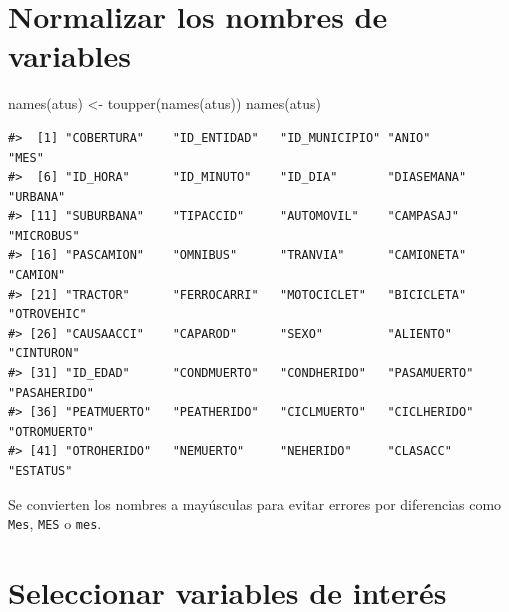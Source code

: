 \documentclass[
  spanish,
  10.5pt,
  letterpaper,
  openany,
  headings=big]{scrbook}
\newenvironment{Shaded}{}{}
\newcommand{\FunctionTok}[1]{\textcolor[rgb]{0.44,0.26,0.76}{#1}}
\newcommand{\NormalTok}[1]{\textcolor[rgb]{0.14,0.16,0.18}{#1}}
\newcommand{\OtherTok}[1]{\textcolor[rgb]{0.44,0.26,0.76}{#1}}
\begin{document}
\section{Normalizar los nombres de
variables}\label{normalizar-los-nombres-de-variables}

\begin{Shaded}
\begin{Highlighting}[]
\FunctionTok{names}\NormalTok{(atus) }\OtherTok{\textless{}{-}} \FunctionTok{toupper}\NormalTok{(}\FunctionTok{names}\NormalTok{(atus))}
\FunctionTok{names}\NormalTok{(atus)}
\end{Highlighting}
\end{Shaded}

\begin{verbatim}
#>  [1] "COBERTURA"    "ID_ENTIDAD"   "ID_MUNICIPIO" "ANIO"         "MES"         
#>  [6] "ID_HORA"      "ID_MINUTO"    "ID_DIA"       "DIASEMANA"    "URBANA"      
#> [11] "SUBURBANA"    "TIPACCID"     "AUTOMOVIL"    "CAMPASAJ"     "MICROBUS"    
#> [16] "PASCAMION"    "OMNIBUS"      "TRANVIA"      "CAMIONETA"    "CAMION"      
#> [21] "TRACTOR"      "FERROCARRI"   "MOTOCICLET"   "BICICLETA"    "OTROVEHIC"   
#> [26] "CAUSAACCI"    "CAPAROD"      "SEXO"         "ALIENTO"      "CINTURON"    
#> [31] "ID_EDAD"      "CONDMUERTO"   "CONDHERIDO"   "PASAMUERTO"   "PASAHERIDO"  
#> [36] "PEATMUERTO"   "PEATHERIDO"   "CICLMUERTO"   "CICLHERIDO"   "OTROMUERTO"  
#> [41] "OTROHERIDO"   "NEMUERTO"     "NEHERIDO"     "CLASACC"      "ESTATUS"
\end{verbatim}

Se convierten los nombres a mayúsculas para evitar errores por
diferencias como \texttt{Mes}, \texttt{MES} o \texttt{mes}.

\section{Seleccionar variables de
interés}\label{seleccionar-variables-de-interuxe9s}
\end{document}
